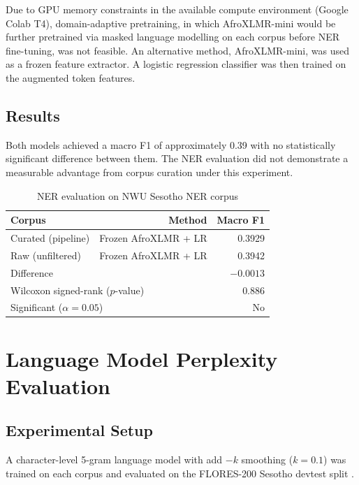 \documentclass[12pt]{ThesisRU}
\begin{document}
Due to GPU memory constraints in the available compute environment (Google Colab T4), domain-adaptive pretraining, in which AfroXLMR-mini \citep{alabi-etal-2025-charting} would be further pretrained via masked language modelling on each corpus before NER fine-tuning, was not feasible. An alternative method, AfroXLMR-mini, was used as a frozen feature extractor. A logistic regression classifier was then trained on the augmented token features. 

\subsection{Results}

Both models achieved a macro F1 of approximately 0.39 with no statistically significant difference between them. The NER evaluation did not demonstrate a measurable advantage from corpus curation under this experiment.

\begin{table}[ht]
    \centering
    \begin{tabular}{lrr}
    \toprule
    \textbf{Corpus} & \textbf{Method} & \textbf{Macro F1} \\
    \midrule
    Curated (pipeline) & Frozen AfroXLMR + LR & 0.3929 \\
    Raw (unfiltered)   & Frozen AfroXLMR + LR & 0.3942 \\
    \midrule
    \multicolumn{2}{l}{Difference} & $-0.0013$ \\
    \multicolumn{2}{l}{Wilcoxon signed-rank ($p$-value)} & 0.886 \\
    \multicolumn{2}{l}{Significant ($\alpha = 0.05$)} & No \\
    \bottomrule
    \end{tabular}
    \caption{NER evaluation on NWU Sesotho NER corpus}
    \label{tab:ner_results}
\end{table}


\section{Language Model Perplexity Evaluation}

\subsection{Experimental Setup}
A character-level 5-gram language model with add $-k$ smoothing ($k = 0.1$) was trained on each corpus and evaluated on the FLORES-200 Sesotho devtest split \citep{nllb2022}. 
\end{document}
